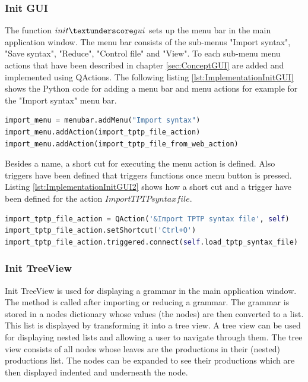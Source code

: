 \subsubsection{Init GUI}\label{sec:ImplementationGUIInit}

The function $init\textunderscore gui$ sets up the menu bar in the main application window. The menu bar consists of the sub-menus "Import syntax", "Save syntax", "Reduce", "Control file" and "View". To each sub-menu menu actions that have been described in chapter \ref{sec:ConceptGUI} are added and implemented using QActions. The following listing \ref{lst:ImplementationInitGUI} shows the Python code for adding a menu bar and menu actions for example for the "Import syntax" menu bar.

\begin{lstlisting}[language=Python, basicstyle=\scriptsize	,caption= Implementation of menu bar,label= lst:ImplementationInitGUI]
import_menu = menubar.addMenu("Import syntax")
import_menu.addAction(import_tptp_file_action)
import_menu.addAction(import_tptp_file_from_web_action)
\end{lstlisting}

Besides a name, a short cut for executing the menu action is defined. Also triggers have been defined that triggers functions once menu button is pressed. Listing \ref{lst:ImplementationInitGUI2} shows how a short cut and a trigger have been defined for the action $Import TPTP syntax file$.

\begin{lstlisting}[language=Python, basicstyle=\scriptsize	,caption= Implementation of menu actions,label= lst:ImplementationInitGUI2]
import_tptp_file_action = QAction('&Import TPTP syntax file', self)
import_tptp_file_action.setShortcut('Ctrl+O')
import_tptp_file_action.triggered.connect(self.load_tptp_syntax_file)
\end{lstlisting}


\subsubsection{Init TreeView}\label{sec:ImplementationGUIInitTreeView}
Init TreeView is used for displaying a grammar in the main application window. The method is called after importing or reducing a grammar. The grammar is stored in a nodes dictionary whose values (the nodes) are then converted to a list. This list is displayed by transforming it into a tree view. A tree view can be used for displaying nested lists and allowing a user to navigate through them. The tree view consists of all nodes whose leaves are the productions in their (nested) productions list. The nodes can be expanded to see their productions which are then displayed indented and underneath the node.

